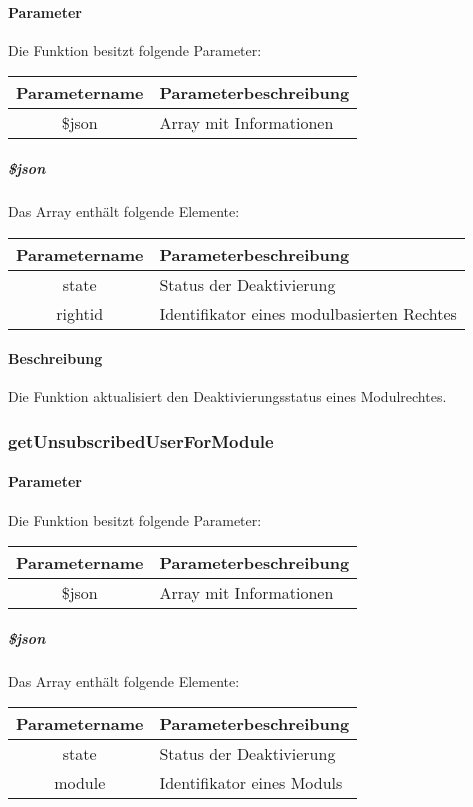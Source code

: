 \paragraph{Parameter} Die Funktion besitzt folgende Parameter:
\begin{table}[H]
	\begin{tabular}{|c|p{11cm}|}
		\hline
		\textbf{Parametername} & \textbf{Parameterbeschreibung} \\ \hline
		\$json & Array mit Informationen \\ \hline
	\end{tabular}
\end{table}
\subparagraph{\$json}Das Array enthält folgende Elemente:
\begin{table}[H]
	\begin{tabular}{|c|p{11cm}|}
		\hline
		\textbf{Parametername} & \textbf{Parameterbeschreibung} \\ \hline
		state    & Status der Deaktivierung \\ \hline
		rightid  & Identifikator eines modulbasierten Rechtes \\ \hline
	\end{tabular}
\end{table}
\paragraph{Beschreibung} Die Funktion aktualisiert den Deaktivierungsstatus eines Modulrechtes.
\subsubsection{getUnsubscribedUserForModule}
\paragraph{Parameter} Die Funktion besitzt folgende Parameter:
\begin{table}[H]
	\begin{tabular}{|c|p{11cm}|}
		\hline
		\textbf{Parametername} & \textbf{Parameterbeschreibung} \\ \hline
		\$json & Array mit Informationen \\ \hline
	\end{tabular}
\end{table}
\subparagraph{\$json}Das Array enthält folgende Elemente:
\begin{table}[H]
	\begin{tabular}{|c|p{11cm}|}
		\hline
		\textbf{Parametername} & \textbf{Parameterbeschreibung} \\ \hline
		state    & Status der Deaktivierung \\ \hline
		module   & Identifikator eines Moduls \\ \hline
	\end{tabular}
\end{table}
